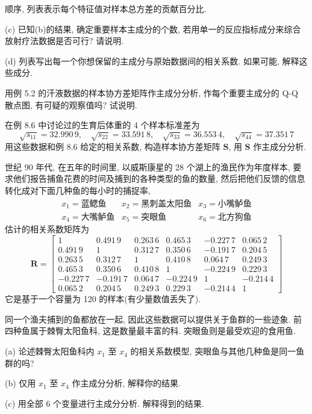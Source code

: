 
顺序, 列表表示每个特征值对样本总方差的贡献百分比.

(c) 已知(b)的结果, 确定重要样本主成分的个数, 若用单一的反应指标成分来综合放射疗法数据是否可行? 请说明.

(d) 列表写出每一个你想保留的主成分与原始数据间的相关系数. 如果可能, 解释这些成分.

\quad 用例 5.2 的汗液数据的样本协方差矩阵作主成分分析, 作每个重要主成分的 Q-Q 散点图, 有可疑的观察值吗? 试说明.

\quad 在例 8.6 中讨论过的生育后体重的 4 个样本标准差为
\[
\sqrt{s_{11}}=32.990\,9,\quad \sqrt{s_{22}}=33.591\,8,\quad \sqrt{s_{33}}=36.553\,4,\quad \sqrt{s_{44}}=37.351\,7
\]
用这些数据和例 8.6 给定的相关系数, 构造样本协方差矩阵 $\mathbf{S}$, 用 $\mathbf{S}$ 作主成分分析.

 世纪 90 年代, 在五年的时间里, 以威斯康星的 28 个湖上的渔民作为年度样本, 要求他们报告捕鱼花费的时间及捕到的各种类型的鱼的数量, 然后把他们反馈的信息转化成对下面几种鱼的每小时的捕捉率,
\[
\begin{array}{lll}
x_1=\text{蓝鳃鱼} & x_2=\text{黑刺盖太阳鱼} & x_3=\text{小嘴鲈鱼}\\
x_4=\text{大嘴鲈鱼} & x_5=\text{突眼鱼} & x_6=\text{北方狗鱼}
\end{array}
\]
估计的相关系数矩阵为
\[
\mathbf{R}=\begin{bmatrix}
1&0.491\,9&0.263\,6&0.465\,3&-0.227\,7&0.065\,2\\
0.491\,9&1&0.312\,7&0.350\,6&-0.191\,7&0.204\,5\\
0.263\,5&0.312\,7&1&0.410\,8&0.064\,7&0.249\,3\\
0.465\,3&0.350\,6&0.410\,8&1&-0.224\,9&0.229\,3\\
-0.227\,7&-0.191\,7&0.064\,7&-0.224\,9&1&-0.214\,4\\
0.065\,2&0.204\,5&0.249\,3&0.229\,3&-0.214\,4&1
\end{bmatrix}
\]
它是基于一个容量为 120 的样本(有少量数值丢失了).

同一个渔夫捕到的鱼都放在一起, 因此这些数据可以提供关于鱼群的一些迹象. 前四种鱼属于棘臀太阳鱼科, 这是数量最丰富的科. 突眼鱼则是最受欢迎的食用鱼.

(a) 论述棘臀太阳鱼科内 $x_1$ 至 $x_4$ 的相关系数模型, 突眼鱼与其他几种鱼是同一鱼群的吗?

(b) 仅用 $x_1$ 至 $x_4$ 作主成分分析, 解释你的结果.

(c) 用全部 6 个变量进行主成分分析. 解释得到的结果.

